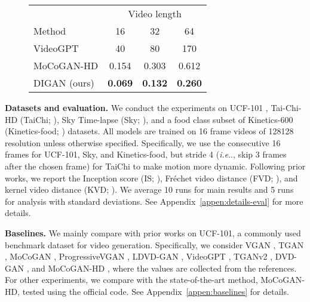 \documentclass{article} \usepackage{iclr2022_conference,times}
\makeatletter
\DeclareRobustCommand\onedot{\futurelet\@let@token\@onedot}
\def\@onedot{\ifx\@let@token.\else.\null\fi\xspace}
\def\ie{\emph{i.e}\onedot} \def\Ie{\emph{I.e}\onedot}
\makeatother
\begin{document}
\begin{figure*}[t]
\begin{minipage}{0.46\textwidth}
{}\label{tab:fast}
\vspace{-0.1in}
\begin{tabular}{lccc}
\toprule
 & \multicolumn{3}{c}{Video length}  \\
\cmidrule(lr){2-4}
Method & 16 & 32 & 64 \\
\midrule
VideoGPT     & 40 & 80 & 170 \\
MoCoGAN-HD   & 0.154 & 0.303 & 0.612 \\
DIGAN (ours) & \textbf{0.069} & \textbf{0.132} & \textbf{0.260} \\
\bottomrule
\end{tabular}
\end{minipage}
\vspace{-0.1in}
\end{figure*}


 
\textbf{Datasets and evaluation.} 
We conduct the experiments on UCF-101 \citep{soomro2012ucf101}, Tai-Chi-HD (TaiChi; \citet{siarohin2019first}), Sky Time-lapse (Sky; \citet{xiong2018learning}), and a food class subset of Kinetics-600 (Kinetics-food; \citet{carreira2018short}) datasets. All models are trained on 16 frame videos of 128128 resolution unless otherwise specified. 
Specifically, we use the consecutive 16 frames for UCF-101, Sky, and Kinetics-food, but stride 4 (\ie, skip 3 frames after the chosen frame) for TaiChi to make motion more dynamic. 
Following prior works, we report the Inception score (IS; \citet{salimans2016improved}), Fr\'echet video distance (FVD; \citet{unterthiner2018towards}), and kernel video distance (KVD; \citet{unterthiner2018towards}). We average 10 runs for main results and 5 runs for analysis with standard deviations. See Appendix~\ref{appen:details-eval} for more details.

\textbf{Baselines.}
We mainly compare \sname with prior works on UCF-101, a commonly used benchmark dataset for video generation. Specifically, we consider VGAN \citep{vondrick2016generating}, TGAN \citep{saito2017temporal}, MoCoGAN \citep{tulyakov2018mocogan}, ProgressiveVGAN \citep{acharya2018towards}, LDVD-GAN \citep{kahembwe2020lower}, VideoGPT \citep{yan2021videogpt}, TGANv2 \citep{saito2020train}, DVD-GAN \citep{clark2019adversarial}, and MoCoGAN-HD \citep{tian2021good}, where the values are collected from the references. For other experiments, we compare \sname with the state-of-the-art method, MoCoGAN-HD, tested using the official code. See Appendix~\ref{appen:baselines} for details.
\end{document}
